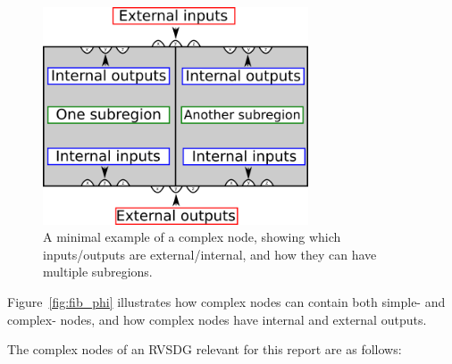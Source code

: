 \begin{figure}[H]
	\centering
	\includegraphics[width=0.7\textwidth]{figures/complex_node_mapping_ex}
	\caption{A minimal example of a complex node, showing which inputs/outputs
are external/internal, and how they can have multiple subregions.}
	\label{fig:complex_node_mapping_ex}
\end{figure}

Figure~\ref{fig:fib_phi} illustrates how complex nodes can contain both simple-
and complex- nodes, and how complex nodes have internal and external outputs.

The complex nodes of an RVSDG relevant for this report are as follows:

